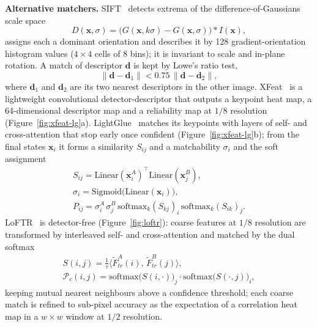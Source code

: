 \documentclass[10pt,a4paper,twocolumn]{article}
\begin{document}
\textbf{Alternative matchers.} SIFT~\cite{sift} detects extrema of the difference-of-Gaussians scale space
\begin{equation}
  D(\mathbf{x},\sigma)=\big(G(\mathbf{x},k\sigma)-G(\mathbf{x},\sigma)\big)*I(\mathbf{x}),
\end{equation}
assigns each a dominant orientation and describes it by 128 gradient-orientation histogram values ($4\times4$ cells of 8 bins); it is invariant to scale and in-plane rotation. A match of descriptor $\mathbf{d}$ is kept by Lowe's ratio test,
\begin{equation}
  \|\mathbf{d}-\mathbf{d}_1\| < 0.75\,\|\mathbf{d}-\mathbf{d}_2\|,
\end{equation}
where $\mathbf{d}_1$ and $\mathbf{d}_2$ are its two nearest descriptors in the other image. XFeat~\cite{xfeat} is a lightweight convolutional detector-descriptor that outputs a keypoint heat map, a 64-dimensional descriptor map and a reliability map at $1/8$ resolution (Figure~\ref{fig:xfeat-lg}a). LightGlue~\cite{lightglue} matches its keypoints with layers of self- and cross-attention that stop early once confident (Figure~\ref{fig:xfeat-lg}b); from the final states $\mathbf{x}_i$ it forms a similarity $S_{ij}$ and a matchability $\sigma_i$ and the soft assignment
\begin{gather}
  S_{ij}=\mathrm{Linear}(\mathbf{x}^A_i)^\top\mathrm{Linear}(\mathbf{x}^B_j),\\
  \sigma_i=\mathrm{Sigmoid}\big(\mathrm{Linear}(\mathbf{x}_i)\big),\\
  P_{ij}=\sigma^A_i\,\sigma^B_j\,\mathrm{softmax}_k(S_{kj})_i\,\mathrm{softmax}_k(S_{ik})_j .
\end{gather}
LoFTR~\cite{loftr} is detector-free (Figure~\ref{fig:loftr}): coarse features at $1/8$ resolution are transformed by interleaved self- and cross-attention and matched by the dual softmax
\begin{gather}
  S(i,j)=\tfrac{1}{\tau}\big\langle\tilde F^A_{tr}(i),\,\tilde F^B_{tr}(j)\big\rangle,\\
  \mathcal P_c(i,j)=\mathrm{softmax}\big(S(i,\cdot)\big)_j\cdot\mathrm{softmax}\big(S(\cdot,j)\big)_i ,
\end{gather}
keeping mutual nearest neighbours above a confidence threshold; each coarse match is refined to sub-pixel accuracy as the expectation of a correlation heat map in a $w\times w$ window at $1/2$ resolution.
\end{document}
